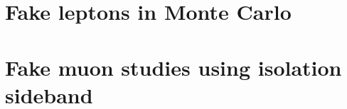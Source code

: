\documentclass{cmspaper}
\begin{document}
\clearpage
\section{Fake leptons in Monte Carlo}
\label{app:appendix_mcFakes}


\clearpage
\section{Fake muon studies using isolation sideband}
\label{app:appendix_fakeIso}


%






\end{document}
